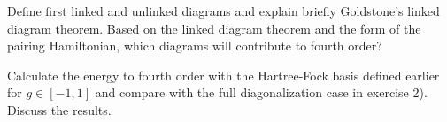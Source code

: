 \documentclass[prc]{revtex4} \usepackage[dvips]{graphicx}
\begin{document}
\begin{enumerate}
Define first linked and unlinked diagrams and explain briefly Goldstone's linked diagram theorem.
Based on the linked diagram theorem and the form of the pairing Hamiltonian, which diagrams will contribute
to fourth order? 

Calculate the energy to fourth order with the Hartree-Fock basis defined earlier for $g\in [-1,1]$ and compare
with the full diagonalization case in exercise 2). Discuss the results.
\end{enumerate}



 
\end{document}
